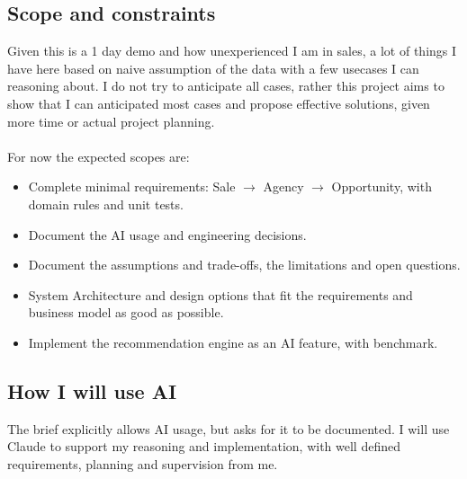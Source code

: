 \documentclass[13pt, a4paper]{article}
\begin{document}
\subsection{Scope and constraints}
Given this is a 1 day demo and how unexperienced I am in sales, a lot of things I have here based on naive assumption 
of the data with a few usecases I can reasoning about. I do not try to anticipate all cases, rather this project aims to show that 
I can anticipated most cases and propose effective solutions, given more time or actual project planning. 
\\\\
For now the expected scopes are:
\begin{itemize}
    \item Complete minimal requirements: Sale $\rightarrow$ Agency $\rightarrow$ Opportunity, with domain rules and unit tests.
    \item Document the AI usage and engineering decisions.
    \item Document the assumptions and trade-offs, the limitations and open questions.
    \item System Architecture and design options that fit the requirements and business model as good as possible.
    \item Implement the recommendation engine as an AI feature, with benchmark. 
\end{itemize}

\subsection{How I will use AI}
The brief explicitly allows AI usage, but asks for it to be documented. I will use Claude to support my reasoning and implementation, 
with well defined requirements, planning and supervision from me.
\end{document}
